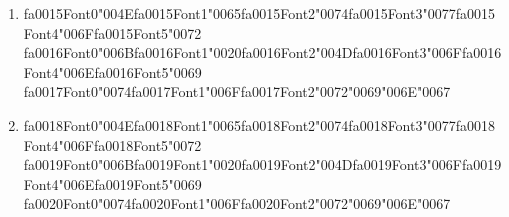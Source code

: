 \documentclass[12pt]{article}
\begin{document}
\begin{enumerate}[label=\arabic*.]
\begin{enumerate}[label=(\alph*)]
    \item {\csname fa0015Font0\endcsname\char"004E}{\csname fa0015Font1\endcsname\char"0065}{\csname fa0015Font2\endcsname\char"0074}{\csname fa0015Font3\endcsname\char"0077}{\csname fa0015Font4\endcsname\char"006F}{\csname fa0015Font5\endcsname\char"0072} {\csname fa0016Font0\endcsname\char"006B}{\csname fa0016Font1\endcsname\char"0020}{\csname fa0016Font2\endcsname\char"004D}{\csname fa0016Font3\endcsname\char"006F}{\csname fa0016Font4\endcsname\char"006E}{\csname fa0016Font5\endcsname\char"0069} {\csname fa0017Font0\endcsname\char"0074}{\csname fa0017Font1\endcsname\char"006F}{\csname fa0017Font2\endcsname\char"0072}{\char"0069}{\char"006E}{\char"0067}
    \item {\csname fa0018Font0\endcsname\char"004E}{\csname fa0018Font1\endcsname\char"0065}{\csname fa0018Font2\endcsname\char"0074}{\csname fa0018Font3\endcsname\char"0077}{\csname fa0018Font4\endcsname\char"006F}{\csname fa0018Font5\endcsname\char"0072} {\csname fa0019Font0\endcsname\char"006B}{\csname fa0019Font1\endcsname\char"0020}{\csname fa0019Font2\endcsname\char"004D}{\csname fa0019Font3\endcsname\char"006F}{\csname fa0019Font4\endcsname\char"006E}{\csname fa0019Font5\endcsname\char"0069} {\csname fa0020Font0\endcsname\char"0074}{\csname fa0020Font1\endcsname\char"006F}{\csname fa0020Font2\endcsname\char"0072}{\char"0069}{\char"006E}{\char"0067}
\end{enumerate}
\end{enumerate}
\end{document}
